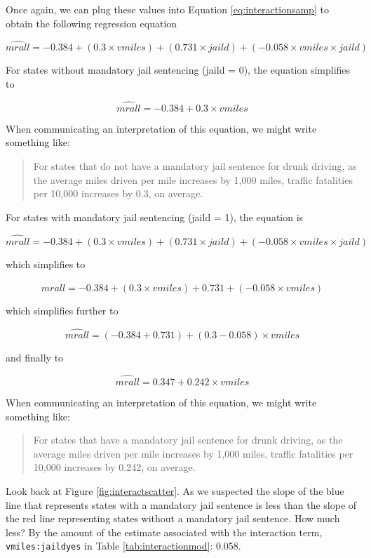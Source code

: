 \documentclass[
]{book}
\begin{document}
Once again, we can plug these values into Equation \eqref{eq:interactionsamp} to obtain the following regression equation

\[\hat{mrall} = -0.384 + (0.3\times vmiles) + (0.731\times jaild) + (-0.058\times vmiles \times jaild)\]

For states without mandatory jail sentencing (jaild = 0), the equation simplifies to

\[\hat{mrall} = -0.384 + 0.3\times vmiles\]

When communicating an interpretation of this equation, we might write something like:

\begin{quote}
For states that do not have a mandatory jail sentence for drunk driving, as the average miles driven per mile increases by 1,000 miles, traffic fatalities per 10,000 increases by 0.3, on average.
\end{quote}

For states with mandatory jail sentencing (jaild = 1), the equation is

\[\hat{mrall} = -0.384 + (0.3\times vmiles) + (0.731\times jaild) + (-0.058\times vmiles \times jaild)\]

which simplifies to

\[\hat{mrall} = -0.384 + (0.3\times vmiles) + 0.731 + (-0.058\times vmiles)\]

which simplifies further to

\[\hat{mrall} = (-0.384 + 0.731) + (0.3-0.058)\times vmiles\]

and finally to

\[\hat{mrall} = 0.347 + 0.242\times vmiles\]

When communicating an interpretation of this equation, we might write something like:

\begin{quote}
For states that have a mandatory jail sentence for drunk driving, as the average miles driven per mile increases by 1,000 miles, traffic fatalities per 10,000 increases by 0.242, on average.
\end{quote}

Look back at Figure \ref{fig:interactscatter}. As we suspected the slope of the blue line that represents states with a mandatory jail sentence is less than the slope of the red line representing states without a mandatory jail sentence. How much less? By the amount of the estimate associated with the interaction term, \texttt{vmiles:jaildyes} in Table \ref{tab:interactionmod}: 0.058.
\end{document}
